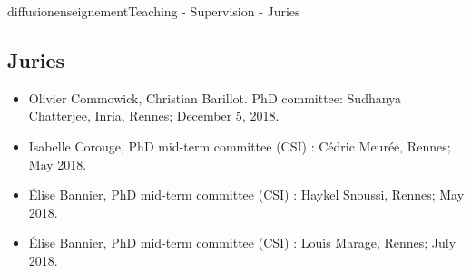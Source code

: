 \documentclass{ra2018}
\begin{document}
\begin{module}{diffusion}{enseignement}{Teaching - Supervision - Juries}
\subsection {Juries}
\begin{itemize}
    \item Olivier Commowick, Christian Barillot. PhD committee: Sudhanya Chatterjee, Inria, Rennes; December 5, 2018.
    \item Isabelle Corouge, PhD mid-term committee (CSI) : Cédric Meurée, Rennes; May 2018.
    \item Élise Bannier, PhD mid-term committee (CSI) : Haykel Snoussi, Rennes; May 2018.
    \item Élise Bannier, PhD mid-term committee (CSI) : Louis Marage, Rennes; July 2018.
\end{itemize}


\end{module}
\end{document}
